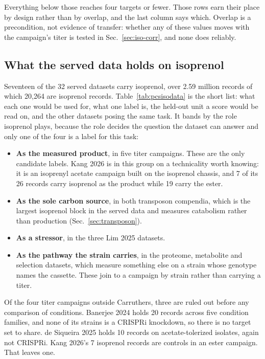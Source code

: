 Everything below those reaches four targets or fewer. Those rows earn their place by
design rather than by overlap, and the last column says which. Overlap is a
precondition, not evidence of transfer: whether any of these values moves with the
campaign's titer is tested in Sec.~\ref{sec:iso-corr}, and none does reliably.

\clearpage


\subsection{What the served data holds on isoprenol}\label{sec:iso-all}

Seventeen of the 32 served  datasets carry isoprenol, over 2.59 million
records of which 20,264 are isoprenol records. Table~\ref{tab:pcsisodata} is the short
list: what each one would be used for, what one label is, the held-out unit a score
would be read on, and the other datasets posing the same task. It bands by the role
isoprenol plays, because the role decides the question the dataset can answer and only
one of the four is a label for this task:

\begin{itemize}[nosep,leftmargin=1.4em]
\item \textbf{As the measured product}, in five titer campaigns. These are the only
candidate labels. Kang 2026 is in this group on a technicality worth knowing: it is an
isoprenyl acetate campaign built on the isoprenol chassis, and 7 of its 26 records
carry isoprenol as the product while 19 carry the ester.
\item \textbf{As the sole carbon source}, in both transposon compendia, which is the
largest isoprenol block in the served data and measures catabolism rather than
production (Sec.~\ref{sec:transposon}).
\item \textbf{As a stressor}, in the three Lim 2025 datasets.
\item \textbf{As the pathway the strain carries}, in the proteome, metabolite and
selection datasets, which measure something else on a strain whose genotype names the
cassette. These join to a campaign by strain rather than carrying a titer.
\end{itemize}

Of the four titer campaigns outside Carruthers, three are ruled out before any
comparison of conditions. Banerjee 2024 holds 20 records across five condition
families, and none of its strains is a CRISPRi knockdown, so there is no target set to
share. de Siqueira 2025 holds 10 records on acetate-tolerized isolates, again not
CRISPRi. Kang 2026's 7 isoprenol records are controls in an ester campaign. That
leaves one.

